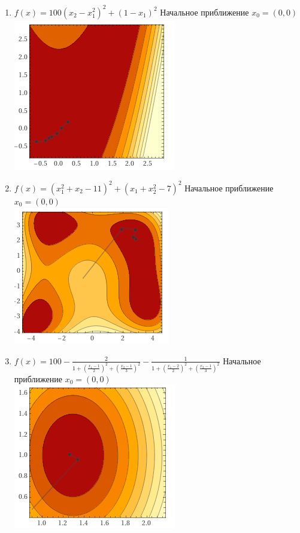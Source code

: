 \documentclass[a4paper, 14pt]{article}
\begin{document}
\begin{enumerate}
\item $f(x) = 100(x_2 - x_1^2)^2 + (1 - x_1)^2 $
Начальное приближение $x_0 = (0, 0)$\\
\includegraphics{img/K6.png}\\

\item $f(x) = (x_1^2 + x_2 - 11)^2 + (x_1 + x_2^2 - 7) ^ 2 $
Начальное приближение $x_0 = (0, 0)$\\
\includegraphics{img/K7.png}\\

\item $f(x) = 100 -\frac{2}{1 + (\frac{x_1 - 1}{2})^2 + (\frac{x_2 - 1}{3})^2} -\frac{1}{1 + (\frac{x_1 - 2}{2})^2 + (\frac{x_2 - 1}{3})^2} $
Начальное приближение $x_0 = (0, 0)$\\
\includegraphics{img/K8.png}\\
\end{enumerate}
\end{document}
